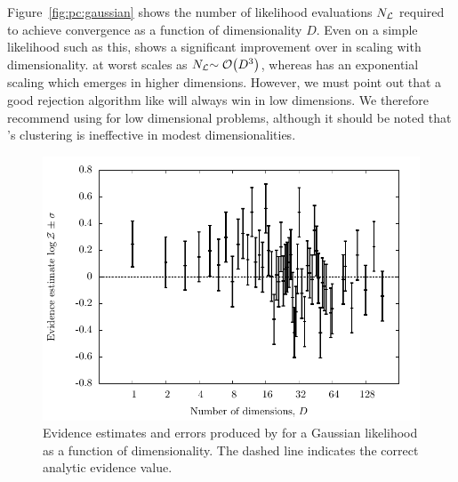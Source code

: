 Figure~\ref{fig:pc:gaussian} shows the number of likelihood evaluations $N_{\mathcal{L}}$ required to achieve convergence as a function of dimensionality $D$. 
Even on a simple likelihood such as this, \PolyChord{} shows a significant improvement over \MultiNest{} in scaling with dimensionality.  \PolyChord{} at worst scales as ${N_{\mathcal{L}}{\sim\mathcal{O}{\left(D^3\right)}}}$, whereas \MultiNest{} has an exponential scaling which emerges in higher dimensions.
However, we must point out that a good rejection algorithm like \MultiNest{} will always win in low dimensions. We therefore recommend using \MultiNest{} for low dimensional problems, although it should be noted that \MultiNest{}'s clustering is ineffective in modest dimensionalities.

\begin{figure}[tp]
  \centering
  \includegraphics[width=\columnwidth]{chapter_polychord/figures/gaussian_evidences}
  \caption{%
    Evidence estimates and errors produced by \PolyChord{} for a Gaussian likelihood as a function of dimensionality. The dashed line indicates the correct analytic evidence value.\label{fig:pc:gaussian_evidences}
}
\end{figure}

